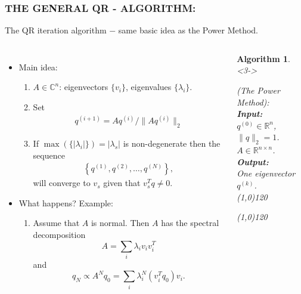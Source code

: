 \documentclass[a4paper,8pt]{beamer} %
\newcommand{\norm}[1]{\lVert{#1}\rVert}
\newtheorem{algo}{Algorithm}%
\begin{document}
\begin{frame} %
\frametitle{THE GENERAL QR - ALGORITHM:}
The QR iteration algorithm $-$ same basic idea as the Power Method.
%
%
\begin{columns}
%
%
\column{7cm}
\begin{itemize}
	\item<1-> Main idea: 
		\begin{enumerate}
			\item
				$A\in\mathbb C^n$: eigenvectors $\{v_i\}$, eigenvalues $\{\lambda_i\}$.
				\item 
					Set 
					\begin{align*}
						q^{(i+1)} = A q^{(i)} /  \norm{A q^{(i)}}_2
					\end{align*}
			\item 
				If $\max{}(\{|\lambda_i|\})=|\lambda_s|$ is non-degenerate then the sequence
				\begin{align*}
					\left\{ q^{(1)}, q^{(2)},\dots,q^{(N)} \right\},
				\end{align*}
				will converge to $v_s$
				given that $v_s^Tq\neq0$.
		\end{enumerate}
	\item<2-> What happens? Example: 
		\begin{enumerate}
			\item
				Assume that $A$ is normal. Then $A$ has the spectral decomposition
				\[ A = \sum_i\lambda_i v_iv_i^T \]
				and
				\[ q_N \propto A^Nq_0 = \sum_i \lambda_i^N (v_i^T q_0) v_i. \]
		\end{enumerate}
\end{itemize}
%
%
\column{5cm}
\begin{algo}<3->
\begin{footnotesize}
{
%
	(The Power Method):
%
}\\
\textbf{Input: }
{
%
	\\$q^{(0)}\in\mathbb R^n$, $\norm{q}_2=1$.
	\\$A\in\mathbb R^{n\times n}$.
%
}\\
\textbf{Output: }
{
%
	\\One eigenvector $q^{(k)}$.
%
}\\
\line(1,0){120}
\begin{algorithmic}
%
	\State{$q^{(k)}\gets z/\norm{z}_2$}
\EndFor{}
%
\end{algorithmic}
\line(1,0){120}
\end{footnotesize}
\end{algo}
\end{columns}	
\end{frame} %
\end{document}
